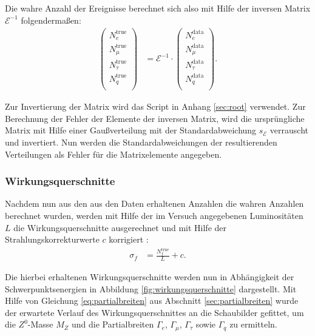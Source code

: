 Die wahre Anzahl der Ereignisse berechnet sich also mit Hilfe der inversen Matrix $\mathcal{E}^{-1}$ folgendermaßen:
\begin{align}
\begin{pmatrix}
N_e^\text{true}\\
N_\mu^\text{true}\\
N_\tau^\text{true}\\
N_q^\text{true}\\
\end{pmatrix}
&=
\mathcal{E}^{-1}\cdot
\begin{pmatrix}
N_e^\text{data}\\
N_\mu^\text{data}\\
N_\tau^\text{data}\\
N_q^\text{data}\\
\end{pmatrix}\text{.}
\end{align}

Zur Invertierung der Matrix wird das Script  in Anhang \ref{sec:root} verwendet. Zur Berechnung der Fehler der Elemente der inversen Matrix, wird die ursprüngliche Matrix mit Hilfe einer Gaußverteilung mit der Standardabweichung $s_\mathcal{E}$ verrauscht und invertiert. Nun werden die Standardabweichungen der resultierenden Verteilungen als Fehler für die Matrixelemente angegeben.

\subsubsection{Wirkungsquerschnitte}

Nachdem nun aus den aus den Daten erhaltenen Anzahlen die wahren Anzahlen berechnet wurden, werden mit Hilfe der im Versuch angegebenen Luminositäten $L$ die Wirkungsquerschnitte ausgerechnet und mit Hilfe der Strahlungskorrekturwerte $c$ korrigiert \cite{anleitungalt}:
\begin{align}
	\sigma_f&=\frac{N_f^\text{true}}{L}+c\text{.}
\end{align}

Die hierbei erhaltenen Wirkungsquerschnitte werden nun in Abhängigkeit der Schwerpunktsenergien in Abbildung \ref{fig:wirkungsquerschnitte} dargestellt. Mit Hilfe von Gleichung \ref{eq:partialbreiten} aus Abschnitt \ref{sec:partialbreiten} wurde der erwartete Verlauf des Wirkungsquerschnittes an die Schaubilder gefittet, um die $Z^0$-Masse $M_Z$ und die Partialbreiten $\Gamma_e$, $\Gamma_\mu$, $\Gamma_\tau$ sowie $\Gamma_q$ zu ermitteln.\\

